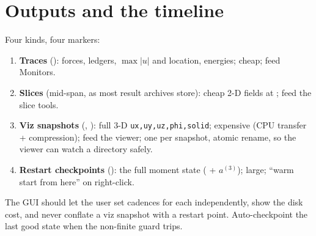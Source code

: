 \documentclass[11pt,a4paper]{article}
\newcommand{\code}[1]{\texttt{#1}}
\begin{document}
\section{Outputs and the timeline}\label{sec:outputs}
Four kinds, four markers:
\begin{enumerate}
\item \textbf{Traces} (): forces, ledgers, $\max|u|$ and
  location, energies; cheap; feed Monitors.
\item \textbf{Slices} (mid-span, as most result archives store): cheap 2-D fields
  at ; feed the slice tools.
\item \textbf{Viz snapshots} (, ): full 3-D
  \code{ux,uy,uz,phi,solid}; expensive (CPU transfer + compression); feed the viewer;
  one  per snapshot, atomic rename, so the viewer can watch a directory
  safely.
\item \textbf{Restart checkpoints} (): the full moment state
  ( + $a^{(3)}$); large; ``warm start from here'' on right-click.
\end{enumerate}
The GUI should let the user set cadences for each independently, show the disk cost,
and never conflate a viz snapshot with a restart point. Auto-checkpoint the last
good state when the non-finite guard trips.

\end{document}
